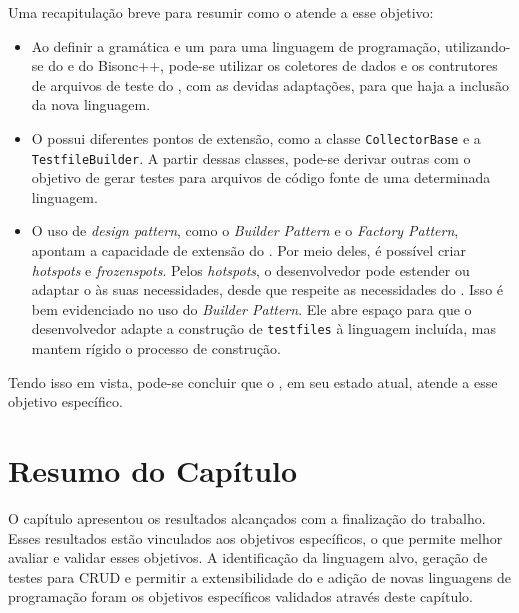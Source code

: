 Uma recapitulação breve para resumir como o \scarefault atende a esse objetivo:
\begin{itemize}
\item Ao definir a gramática e um \parser para uma linguagem de programação,
utilizando-se do \flexcpp e do \textsf{Bisonc++}, pode-se utilizar os coletores
de dados e os contrutores de arquivos de teste do \Scarefault, com as devidas
adaptações, para que haja a inclusão da nova linguagem.
\item O \framework possui diferentes pontos de extensão, como a classe
\lstinline|CollectorBase| e a \lstinline|TestfileBuilder|. A partir dessas
classes, pode-se derivar outras com o objetivo de gerar testes para arquivos
de código fonte de uma determinada linguagem.
\item O uso de \textit{design pattern}, como o \textit{Builder Pattern} e o
\textit{Factory Pattern}, apontam a capacidade de extensão do \framework. Por
meio deles, é possível criar \textit{hotspots} e \textit{frozenspots}. Pelos
\textit{hotspots}, o desenvolvedor pode estender ou adaptar o \scarefault às
suas necessidades, desde que respeite as necessidades do \framework. Isso
é bem evidenciado no uso do \textit{Builder Pattern}. Ele abre espaço para
que o desenvolvedor adapte a construção de \lstinline|testfiles| à linguagem
incluída, mas mantem rígido o processo de construção.
\end{itemize}

Tendo isso em vista, pode-se concluir que o \Scarefault, em seu estado atual,
atende a esse objetivo específico.

\section{Resumo do Capítulo}
O capítulo apresentou os resultados alcançados com a finalização do trabalho.
Esses resultados estão vinculados aos objetivos específicos, o que
permite melhor avaliar e validar esses objetivos. A identificação da linguagem
alvo, geração de testes para CRUD e permitir a extensibilidade do \framework
e adição de novas linguagens de programação foram os objetivos específicos
validados através deste capítulo.